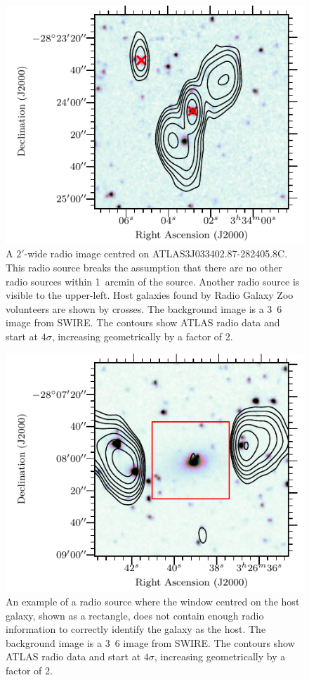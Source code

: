     \begin{figure}
      \centering
      \includegraphics[width=0.6\linewidth]{atlas-images/CI0077C1_fig.pdf}
      \caption[A radio source breaking our assumption that there are no other radio sources with 1~arcmin of the source.]{A $2'$-wide radio image centred on ATLAS3\textunderscore{}J033402.87-282405.8C.
        This radio source breaks the assumption that there are no other radio
        sources within 1~arcmin of the source. Another radio source is visible
        to the upper-left. Host galaxies found by Radio Galaxy Zoo volunteers
        are shown by crosses. {The background image
        is a \unit{3.6}{\micro\meter} image from SWIRE. The contours show ATLAS radio data and start at $4\sigma$, increasing geometrically by a factor of 2.}}
      \label{fig:broken-isolation}
    \end{figure}

    \begin{figure}
      \centering
      \includegraphics[width=0.6\linewidth]{atlas-images/CI2363_fig.pdf}
      \caption[A radio source where the window centred on the host galaxy does not contain enough radio information to correctly identify the galaxy as a host.]{An example of a radio source where the window centred on the
        host galaxy, shown as a rectangle, does not contain enough radio
        information to correctly identify the galaxy as the host. {The background image
        is a \unit{3.6}{\micro\meter} image from SWIRE. The contours show ATLAS radio data and start at $4\sigma$, increasing geometrically by a factor of 2.}}
      \label{fig:broken-window-size}
    \end{figure}

